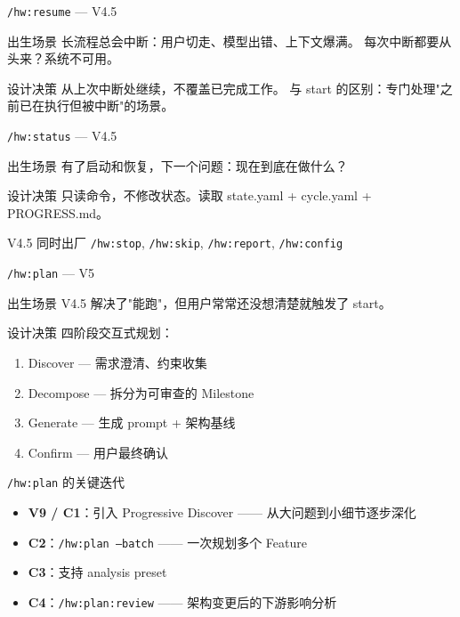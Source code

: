 \documentclass[theme=workflow,aspectratio=169,fontset=tech]{Hypo-Slide}
\begin{document}
\begin{frame}{\texttt{/hw:resume} — V4.5}
  \begin{block}{出生场景}
    长流程总会中断：用户切走、模型出错、上下文爆满。
    每次中断都要从头来？系统不可用。
  \end{block}
  \begin{block}{设计决策}
    从上次中断处继续，不覆盖已完成工作。
    与 start 的区别：专门处理"之前已在执行但被中断"的场景。
  \end{block}
\end{frame}

\begin{frame}{\texttt{/hw:status} — V4.5}
  \begin{block}{出生场景}
    有了启动和恢复，下一个问题：现在到底在做什么？
  \end{block}
  \begin{block}{设计决策}
    只读命令，不修改状态。读取 state.yaml + cycle.yaml + PROGRESS.md。
  \end{block}
  \begin{alertblock}{V4.5 同时出厂}
    \texttt{/hw:stop}, \texttt{/hw:skip}, \texttt{/hw:report}, \texttt{/hw:config}
  \end{alertblock}
\end{frame}

\begin{frame}{\texttt{/hw:plan} — V5}
  \begin{block}{出生场景}
    V4.5 解决了"能跑"，但用户常常还没想清楚就触发了 start。
  \end{block}
  \begin{block}{设计决策}
    四阶段交互式规划：
    \begin{enumerate}
      \item Discover — 需求澄清、约束收集
      \item Decompose — 拆分为可审查的 Milestone
      \item Generate — 生成 prompt + 架构基线
      \item Confirm — 用户最终确认
    \end{enumerate}
  \end{block}
\end{frame}

\begin{frame}{\texttt{/hw:plan} 的关键迭代}
  \begin{itemize}
    \item \textbf{V9 / C1}：引入 Progressive Discover ——
      从大问题到小细节逐步深化
    \item \textbf{C2}：\texttt{/hw:plan --batch} ——
      一次规划多个 Feature
    \item \textbf{C3}：支持 analysis preset
    \item \textbf{C4}：\texttt{/hw:plan:review} ——
      架构变更后的下游影响分析
  \end{itemize}
\end{frame}
\end{document}
